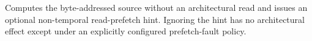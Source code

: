 Computes the byte-addressed source without an architectural read and issues an optional non-temporal read-prefetch hint. Ignoring the hint has no architectural effect except under an explicitly configured prefetch-fault policy.
